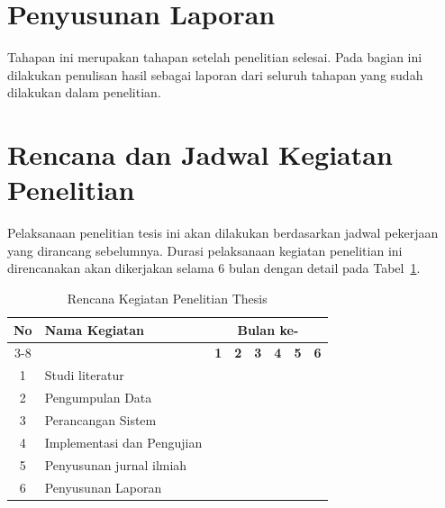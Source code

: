 \section{Penyusunan Laporan}
\label{sec:penyusunan-laporan}

Tahapan ini merupakan tahapan setelah penelitian selesai. Pada bagian ini dilakukan penulisan hasil sebagai laporan dari seluruh tahapan yang sudah dilakukan dalam penelitian.

\section{Rencana dan Jadwal Kegiatan Penelitian}
\label{sec:jadwal-penelitian}

Pelaksanaan penelitian tesis ini akan dilakukan berdasarkan jadwal pekerjaan yang dirancang sebelumnya. Durasi pelaksanaan kegiatan penelitian ini direncanakan akan dikerjakan selama 6 bulan dengan detail pada Tabel~\ref{tab:jadwal-penelitian}.

\begin{table}[htbp]
    \centering
    \caption{Rencana Kegiatan Penelitian Thesis}
    \label{tab:jadwal-penelitian}
    \small
    \begin{tabular}{c p{4.5cm} c c c c c c}
        \toprule
        \textbf{No} & \textbf{Nama Kegiatan} & \multicolumn{6}{c}{\textbf{Bulan ke-}} \\
        \cmidrule(lr){3-8}
        & & \textbf{1} & \textbf{2} & \textbf{3} & \textbf{4} & \textbf{5} & \textbf{6} \\
        \midrule
        1 & Studi literatur & & & & & & \\
        2 & Pengumpulan Data & & & & & & \\
        3 & Perancangan Sistem & & & & & & \\
        4 & Implementasi dan Pengujian & & & & & & \\
        5 & Penyusunan jurnal ilmiah & & & & & & \\
        6 & Penyusunan Laporan & & & & & & \\
        \bottomrule
    \end{tabular}
\end{table}
